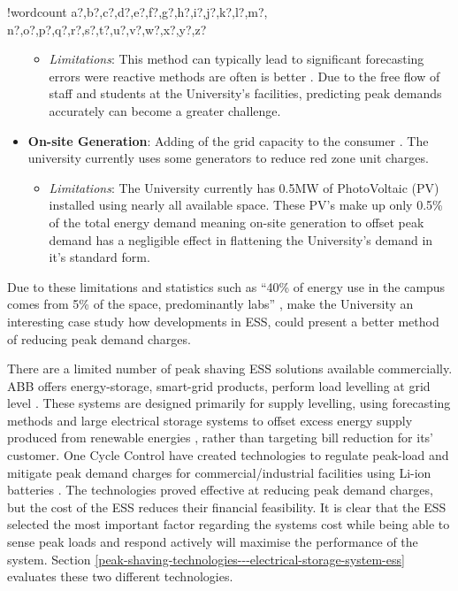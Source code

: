 \documentclass[10pt]{article}
\providecommand{\tightlist}{%
  \setlength{\itemsep}{0pt}\setlength{\parskip}{0pt}}
\newcounter{words}
\newenvironment{counted}{%
  \setcounter{words}{0}
  \SearchList!{wordcount}{\stepcounter{words}}
    {a?,b?,c?,d?,e?,f?,g?,h?,i?,j?,k?,l?,m?,
    n?,o?,p?,q?,r?,s?,t?,u?,v?,w?,x?,y?,z?}
  \UndoBoundary{'}
  \SearchOrder{p;}}{%
  \StopSearching}
\begin{document}
\begin{counted}
\begin{itemize}
  \begin{itemize}
  \tightlist
  \item
    \emph{Limitations}: This method can typically lead to significant
    forecasting errors were reactive methods are often is better
    \cite{6938948}. Due to the free flow of staff and students at the
    University's facilities, predicting peak demands accurately can
    become a greater challenge.
  \end{itemize}
\item
  \textbf{On-site Generation}: Adding of the grid capacity to the
  consumer \cite{schneiderRECPS}. The university currently uses some
  generators to reduce red zone unit charges.

  \begin{itemize}
  \tightlist
  \item
    \emph{Limitations}: The University currently has 0.5MW of
    PhotoVoltaic (PV) installed using nearly all available space. These
    PV's make up only 0.5\% of the total energy demand \cite{Jbrentmeet}
    meaning on-site generation to offset peak demand has a negligible
    effect in flattening the University's demand in it's standard form.
  \end{itemize}
\end{itemize}

Due to these limitations and statistics such as ``40\% of energy use in
the campus comes from 5\% of the space, predominantly labs''
\cite{brentemail}, make the University an interesting case study how
developments in ESS, could present a better method of reducing peak
demand charges.

There are a limited number of peak shaving ESS solutions available
commercially. ABB offers energy-storage, smart-grid products, perform
load levelling at grid level \cite{abbpeakshave}. These systems are
designed primarily for supply levelling, using forecasting methods and
large electrical storage systems to offset excess energy supply produced
from renewable energies \cite{5559470}, rather than targeting bill
reduction for its' customer. One Cycle Control have created technologies
to regulate peak-load and mitigate peak demand charges for
commercial/industrial facilities using Li-ion batteries
\cite{peakload38:online}. The technologies proved effective at reducing
peak demand charges, but the cost of the ESS \cite{Demonstr51:online}
reduces their financial feasibility. It is clear that the ESS selected
the most important factor regarding the systems cost while being able to
sense peak loads and respond actively will maximise the performance of
the system. Section
\ref{peak-shaving-technologies---electrical-storage-system-ess}
evaluates these two different technologies.


\end{counted}
\end{document}

